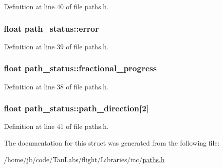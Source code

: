 \-Definition at line 40 of file paths.\-h.

\hypertarget{structpath__status_a673ce13b12050e471c15f386e8193ac7}{
\subsubsection[{error}]{\setlength{\rightskip}{0pt plus 5cm}float {\bf path\-\_\-status\-::error}}}\label{structpath__status_a673ce13b12050e471c15f386e8193ac7}


\-Definition at line 39 of file paths.\-h.

\hypertarget{structpath__status_a4ec0ce142eafe131f8e2d45d1771ebd3}{
\subsubsection[{fractional\-\_\-progress}]{\setlength{\rightskip}{0pt plus 5cm}float {\bf path\-\_\-status\-::fractional\-\_\-progress}}}\label{structpath__status_a4ec0ce142eafe131f8e2d45d1771ebd3}


\-Definition at line 38 of file paths.\-h.

\hypertarget{structpath__status_ac36e4cfed92a1fe959ba8f45728e4779}{
\subsubsection[{path\-\_\-direction}]{\setlength{\rightskip}{0pt plus 5cm}float {\bf path\-\_\-status\-::path\-\_\-direction}\mbox{[}2\mbox{]}}}\label{structpath__status_ac36e4cfed92a1fe959ba8f45728e4779}


\-Definition at line 41 of file paths.\-h.



\-The documentation for this struct was generated from the following file\-:\begin{DoxyCompactItemize}
\item 
/home/jb/code/\-Tau\-Labs/flight/\-Libraries/inc/\hyperlink{paths_8h}{paths.\-h}\end{DoxyCompactItemize}
